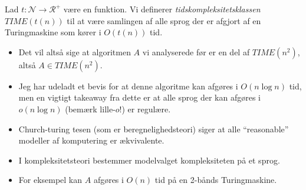 \begin{frame}[allowframebreaks]
	\begin{definition}
		Lad $t : \mathcal{N} \rightarrow \mathcal{R}^{+}$ være en funktion. Vi definerer \textit{tidskompleksitetsklassen} $TIME(t(n))$ til at være samlingen af alle sprog der er afgjort af en Turingmaskine som kører i $O(t(n))$ tid.
	\end{definition}
	\begin{itemize}
		\item Det vil altså sige at algoritmen $A$ vi analyserede før er en del af $TIME(n^{2})$, altså $A \in TIME(n^{2})$.
		\item Jeg har udeladt et bevis for at denne algoritme kan afgøres i $O(n \log n)$ tid, men en vigtigt takeaway fra dette er at alle sprog der kan afgøres i $o(n \log n)$ (bemærk lille-$o$!) er regulære.
		\item Church-turing tesen (som er beregnelighedsteori) siger at alle ``reasonable'' modeller af komputering er ækvivalente.
		\item I kompleksitetsteori bestemmer modelvalget kompleksiteten på et sprog.
		\item For eksempel kan $A$ afgøres i $O(n)$ tid på en 2-bånds Turingmaskine.
	\end{itemize}
\end{frame}

